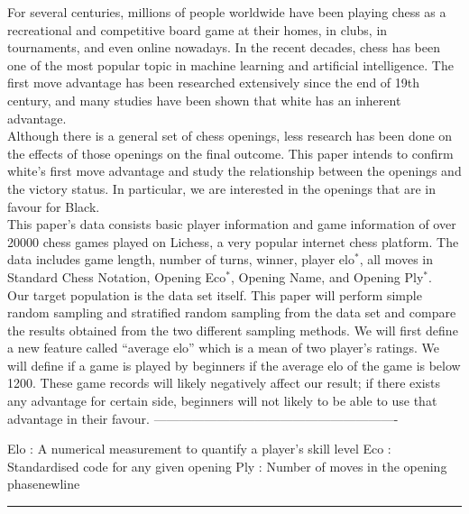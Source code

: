 \documentclass[11pt,]{article}
\begin{document}
For several centuries, millions of people worldwide have been playing
chess as a recreational and competitive board game at their homes, in
clubs, in tournaments, and even online nowadays. In the recent decades,
chess has been one of the most popular topic in machine learning and
artificial intelligence. The first move advantage has been researched
extensively since the end of 19th century, and many studies have been
shown that white has an inherent advantage.\\
\newline Although there is a general set of chess openings, less
research has been done on the effects of those openings on the final
outcome. This paper intends to confirm white's first move advantage and
study the relationship between the openings and the victory status. In
particular, we are interested in the openings that are in favour for
Black.\\
\newline This paper's data consists basic player information and game
information of over 20000 chess games played on Lichess, a very popular
internet chess platform. The data includes game length, number of turns,
winner, player elo\(^*\), all moves in Standard Chess Notation, Opening
Eco\(^*\), Opening Name, and Opening Ply\(^*\).\\
\newline Our target population is the data set itself. This paper will
perform simple random sampling and stratified random sampling from the
data set and compare the results obtained from the two different
sampling methods. We will first define a new feature called ``average
elo'' which is a mean of two player's ratings. We will define if a game
is played by beginners if the average elo of the game is below 1200.
These game records will likely negatively affect our result; if there
exists any advantage for certain side, beginners will not likely to be
able to use that advantage in their favour. \newline
----------------------------------------------------------

\begin{flushleft}
Elo : A numerical measurement to quantify a player's skill level\newline
Eco : Standardised code for any given opening\newline
Ply : Number of moves in the opening phasenewline
\end{flushleft}

\begin{center}\rule{0.5\linewidth}{0.5pt}\end{center}
\end{document}
